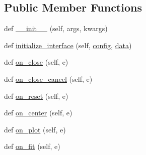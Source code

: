 \subsection*{Public Member Functions}
\begin{DoxyCompactItemize}
\item 
def \hyperlink{class_uni_dec_1_1unidec__modules_1_1peakwidthtools_1_1_peak_tools1d_a77883b9bcc2c0e644390cabf11f2190a}{\+\_\+\+\_\+init\+\_\+\+\_\+} (self, args, kwargs)
\item 
def \hyperlink{class_uni_dec_1_1unidec__modules_1_1peakwidthtools_1_1_peak_tools1d_aab4d0213defd2f32205e05e64c5be717}{initialize\+\_\+interface} (self, \hyperlink{class_uni_dec_1_1unidec__modules_1_1peakwidthtools_1_1_peak_tools1d_a6ff6c8a201fb7f597e7e4a0319e26623}{config}, \hyperlink{class_uni_dec_1_1unidec__modules_1_1peakwidthtools_1_1_peak_tools1d_a7209e1be38d1e677a5aa9c5cf6f0fe3e}{data})
\item 
def \hyperlink{class_uni_dec_1_1unidec__modules_1_1peakwidthtools_1_1_peak_tools1d_a64462abb39406b5c3edfd6e034e062de}{on\+\_\+close} (self, e)
\item 
def \hyperlink{class_uni_dec_1_1unidec__modules_1_1peakwidthtools_1_1_peak_tools1d_a20f1775d790d25f1d730cb3695083e25}{on\+\_\+close\+\_\+cancel} (self, e)
\item 
def \hyperlink{class_uni_dec_1_1unidec__modules_1_1peakwidthtools_1_1_peak_tools1d_a4a32afb026f236ae524b112ee7bdaf00}{on\+\_\+reset} (self, e)
\item 
def \hyperlink{class_uni_dec_1_1unidec__modules_1_1peakwidthtools_1_1_peak_tools1d_a8c5b91834af4336b5a4f3b9528b48fa1}{on\+\_\+center} (self, e)
\item 
def \hyperlink{class_uni_dec_1_1unidec__modules_1_1peakwidthtools_1_1_peak_tools1d_a673259de93d13667df3c70768e3e153c}{on\+\_\+plot} (self, e)
\item 
def \hyperlink{class_uni_dec_1_1unidec__modules_1_1peakwidthtools_1_1_peak_tools1d_a0d8e55db672bf54c7d0bfe5b99194916}{on\+\_\+fit} (self, e)
\end{DoxyCompactItemize}
